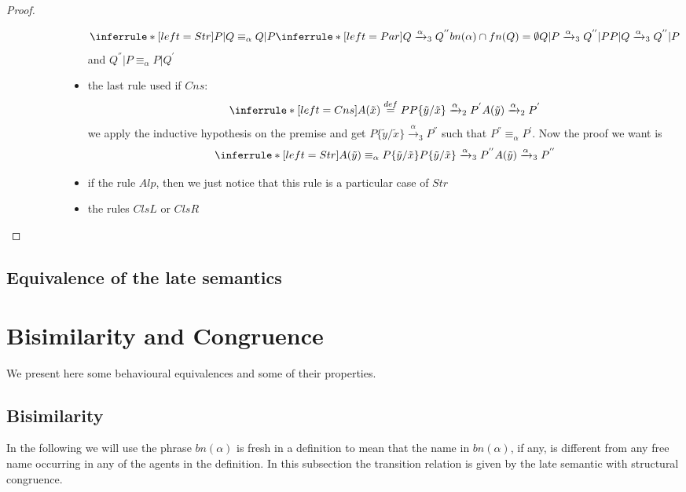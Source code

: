 \begin{theorem}
\begin{proof}
\begin{description}
\begin{description}
\begin{itemize}
		\[
		  \inferrule* [left=Str]{
		      P|Q\equiv_{\alpha}Q|P
		    \\
		      \inferrule* [left=Par]{
			  Q\xrightarrow{\alpha}_{3}Q^{''}
			\\
			  bn(\alpha)\cap fn(Q)=\emptyset
		      }{
			  Q|P\xrightarrow{\alpha}_{3}Q^{''}|P
		      }
		    }{
		      P|Q\xrightarrow{\alpha}_{3}Q^{''}|P
		    }
		\]
		and $Q^{''}|P\equiv_{\alpha}P|Q^{'}$
	      \item
		the last rule used if $Cns$:
		\[
		    \inferrule* [left=Cns]{
			A(\tilde{x})\stackrel{def}{=}P
		      \\
			P\{\tilde{y}/\tilde{x}\}\xrightarrow{\alpha}_{2}P^{'}
		    }{
		      A(\tilde{y})\xrightarrow{\alpha}_{2}P^{'}
		    }
		\]
		we apply the inductive hypothesis on the premise and get $P\{\tilde{y}/\tilde{x}\}\xrightarrow{\alpha}_{3}P^{''}$ such that $P^{''}\equiv_{\alpha}P^{'}$. Now the proof we want is
		\[
		    \inferrule* [left=Str]{
			A(\tilde{y})\equiv_{\alpha}P\{\tilde{y}/\tilde{x}\}
		      \\
			P\{\tilde{y}/\tilde{x}\}\xrightarrow{\alpha}_{3}P^{''}
		    }{
		      A(\tilde{y})\xrightarrow{\alpha}_{3}P^{''}
		    }
		\]		
	      \item
		if the rule $Alp$, then we just notice that this rule is a particular case of $Str$
	      \item
		the rules $ClsL$ or $ClsR$
		
	    \end{itemize}	    
	\end{description}
    \end{description}
  \end{proof}
\end{theorem}

\subsection{Equivalence of the late semantics}


\section{Bisimilarity and Congruence}

We present here some behavioural equivalences and some of their properties. 

\subsection{Bisimilarity}
In the following we will use the phrase $bn(\alpha)$ is fresh in a definition to mean that the name in $bn(\alpha)$, if any, is different from any free name occurring in any of the agents in the definition. In this subsection the transition relation is given by the late semantic with structural congruence.


